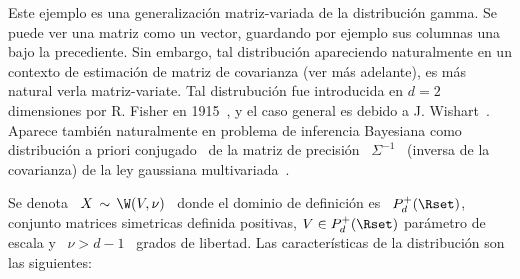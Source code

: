 \label{Sssec:MP:Wishart}

Este ejemplo es una  generalizaci\'on matriz-variada de la distribuci\'on gamma.
Se puede ver  una matriz como un vector, guardando por  ejemplo sus columnas una
bajo la  precediente.  Sin embargo, tal  distribuci\'on apareciendo naturalmente
en un contexto de estimaci\'on de  matriz de covarianza (ver m\'as adelante), es
m\'as natural verla matriz-variate.  Tal distrubuci\'on fue introducida en $d=2$
dimensiones por R. Fisher en 1915~\cite{Fis15}, y el caso general es debido a J.
Wishart~\cite{Wis28,   Mui82,  GupNag99,   And03,  Seb04}.    Aparece  tambi\'en
naturalmente en  problema de inferencia  Bayesiana como distribuci\'on  a priori
conjugado~   de   la   matriz   de   precisi\'on   \
$\Sigma^{-1}$   \   (inversa   de   la   covarianza)   de   la   ley   gaussiana
multivariada~\cite[Ec.~(4.4.5)]{Rob07}.

Se denota \  $X \, \sim \, \W(V,\nu)$  \ donde el dominio de  definici\'on es \
$P_d^+(\Rset)$,  conjunto   matrices  simetricas  definida   positivas,  $V  \in
P_d^+(\Rset)$ par\'ametro de  escala y \ $\nu > d-1$ \  grados de libertad.  Las
caracter\'isticas de la distribuci\'on son las siguientes:

